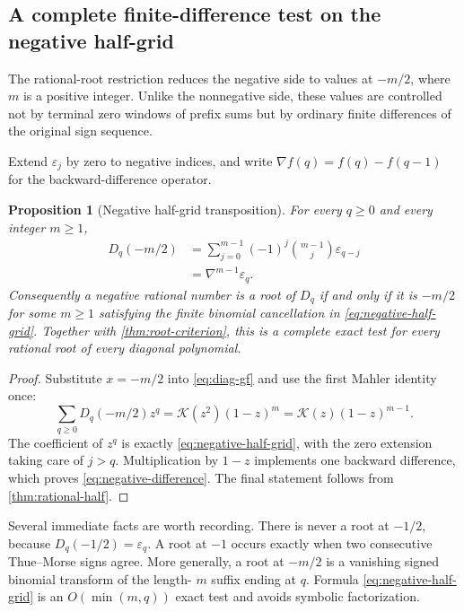 \documentclass[11pt]{article}
\newtheorem{proposition}[theorem]{Proposition}
\theoremstyle{definition}
\theoremstyle{remark}
\newcommand{\eps}{\varepsilon}
\newcommand{\K}{\mathcal K}
\newcommand{\Diag}{D}
\begin{document}
\subsection{A complete finite-difference test on the negative half-grid}

The rational-root restriction reduces the negative side to values at
\(-m/2\), where \(m\) is a positive integer.  Unlike the nonnegative side,
these values are controlled not by terminal zero windows of prefix sums but
by ordinary finite differences of the original sign sequence.

Extend \(\eps_j\) by zero to negative indices, and write
\(\nabla f(q)=f(q)-f(q-1)\) for the backward-difference operator.

\begin{proposition}[Negative half-grid transposition]
\label{prop:negative-half-grid}
For every \(q\geq0\) and every integer \(m\geq1\),
\begin{align}
 \Diag_q(-m/2)
 &=\sum_{j=0}^{m-1}(-1)^j\binom{m-1}{j}\eps_{q-j}          \label{eq:negative-half-grid}\\
 &=\nabla^{m-1}\eps_q.                                    \label{eq:negative-difference}
\end{align}
Consequently a negative rational number is a root of \(\Diag_q\) if and
only if it is \(-m/2\) for some \(m\geq1\) satisfying the finite binomial
cancellation in \cref{eq:negative-half-grid}.  Together with
\cref{thm:root-criterion}, this is a complete exact test for every rational
root of every diagonal polynomial.
\end{proposition}

\begin{proof}
Substitute \(x=-m/2\) into \cref{eq:diag-gf} and use the first Mahler
identity once:
\[
 \sum_{q\geq0}\Diag_q(-m/2)z^q
 =\K(z^2)(1-z)^m
 =\K(z)(1-z)^{m-1}.
\]
The coefficient of \(z^q\) is exactly
\cref{eq:negative-half-grid}, with the zero extension taking care of
\(j>q\).  Multiplication by \(1-z\) implements one backward difference,
which proves \cref{eq:negative-difference}.  The final statement follows
from \cref{thm:rational-half}.
\end{proof}

Several immediate facts are worth recording.  There is never a root at
\(-1/2\), because \(\Diag_q(-1/2)=\eps_q\).  A root at \(-1\) occurs
exactly when two consecutive Thue--Morse signs agree.  More generally, a
root at \(-m/2\) is a vanishing signed binomial transform of the length-
\(m\) suffix ending at \(q\).  Formula \cref{eq:negative-half-grid} is an
\(O(\min(m,q))\) exact test and avoids symbolic factorization.
\end{document}
